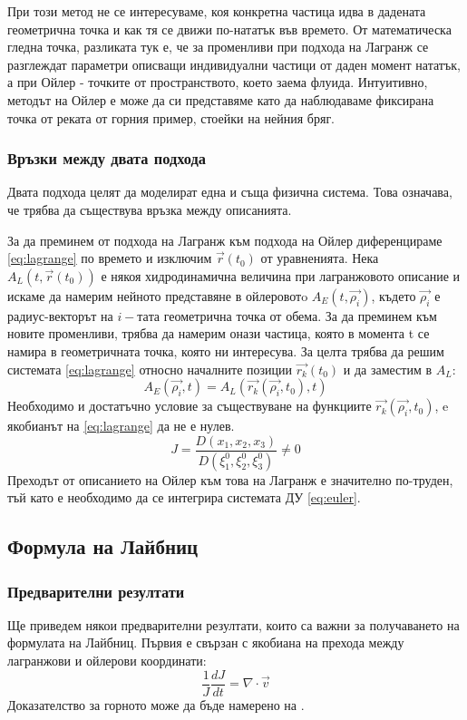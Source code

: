 При този метод не се интересуваме, коя конкретна частица идва в дадената геометрична точка и как тя се движи по-нататък във времето. От математическа гледна точка, разликата тук е, че за променливи при подхода на Лагранж се разглеждат параметри описващи индивидуални частици от даден момент нататък, а при Ойлер - точките от пространството, което
заема флуида.
Интуитивно, методът на Ойлер е може да си представяме като да наблюдаваме фиксирана точка от реката от горния пример, стоейки на нейния бряг.

\subsubsection{Връзки между двата подхода}
Двата подхода целят да моделират една и съща физична система. Това означава, че трябва да съществува връзка между описанията.

За да преминем от подхода на Лагранж към подхода на Ойлер диференцираме \autoref{eq:lagrange} по времето и изключим $\vec{r}(t_0)$ от уравненията.
Нека $A_L(t,\vec{r}(t_0))$ е някоя хидродинамична величина при лагранжовото описание и искаме да намерим нейното представяне в ойлеровотo $A_E(t,\vec{\rho_i})$, където $\vec{\rho_i}$ е радиус-векторът на $i-тата$ геометрична точка от обема.
За да преминем към новите променливи, трябва да намерим онази частица, която в момента t се намира в геометричната точка, която ни интересува. За целта трябва да решим системата \autoref{eq:lagrange} относно началните позиции
$\vec{r_k}(t_0)$ и да заместим в $A_L$:
\begin{equation}
	A_E(\vec{\rho_i},t) = A_L(\vec{r_k}(\vec{\rho_i},t_0), t)
\end{equation}
Необходимо и достатъчно условие за съществуване на функциите $\vec{r_k}(\vec{\rho_i},t_0)$, e якобианът на \autoref{eq:lagrange} да не е нулев.
\begin{equation}
	J = \frac{D(x_1, x_2,x_3)}{D(\xi^{0}_1,\xi^{0}_2,\xi^{0}_3)} \ne 0
\end{equation}
Преходът от описанието на Ойлер към това на Лагранж е значително по-труден, тъй като е необходимо да се интегрира системата ДУ \autoref{eq:euler}.

\subsection{Формула на Лайбниц}
\subsubsection{Предварителни резултати}
Ще приведем някои предварителни резултати, които са важни за получаването на формулата на Лайбниц.
Първия е свързан с якобиана на прехода между лагранжови и ойлерови координати:
\begin{equation}
	\frac{1}{J}\frac{d J}{d t} = \nabla \cdot \vec{v}
	\label{eq:jacobian_div}
\end{equation}
Доказателство за горното може да бъде намерено на \cite{zapryanov_jacobian}.

